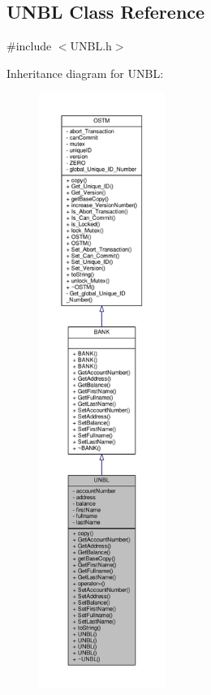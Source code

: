 \hypertarget{class_u_n_b_l}{}\subsection{U\+N\+BL Class Reference}
\label{class_u_n_b_l}


{\ttfamily \#include $<$U\+N\+B\+L.\+h$>$}



Inheritance diagram for U\+N\+BL\+:
\nopagebreak
\begin{figure}[H]
\begin{center}
\leavevmode
\includegraphics[height=550pt]{class_u_n_b_l__inherit__graph}
\end{center}
\end{figure}


